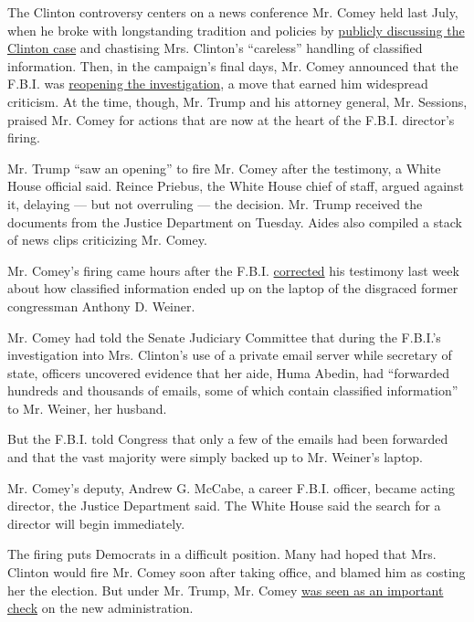 The Clinton controversy centers on a news conference Mr. Comey held last
July, when he broke with longstanding tradition and policies by
\href{https://www.nytimes.com/2016/07/06/us/politics/hillary-clinton-fbi-email-comey.html}{publicly
discussing the Clinton case} and chastising Mrs. Clinton's ``careless''
handling of classified information. Then, in the campaign's final days,
Mr. Comey announced that the F.B.I. was
\href{https://www.nytimes.com/2016/10/29/us/politics/fbi-hillary-clinton-email.html?_r=0}{reopening
the investigation}, a move that earned him widespread criticism. At the
time, though, Mr. Trump and his attorney general, Mr. Sessions, praised
Mr. Comey for actions that are now at the heart of the F.B.I. director's
firing.

Mr. Trump ``saw an opening'' to fire Mr. Comey after the testimony, a
White House official said. Reince Priebus, the White House chief of
staff, argued against it, delaying --- but not overruling --- the
decision. Mr. Trump received the documents from the Justice Department
on Tuesday. Aides also compiled a stack of news clips criticizing Mr.
Comey.

Mr. Comey's firing came hours after the F.B.I.
\href{https://www.nytimes.com/2017/05/09/us/politics/comey-clinton-emails-testimony.html}{corrected}
his testimony last week about how classified information ended up on the
laptop of the disgraced former congressman Anthony D. Weiner.

Mr. Comey had told the Senate Judiciary Committee that during the
F.B.I.'s investigation into Mrs. Clinton's use of a private email server
while secretary of state, officers uncovered evidence that her aide,
Huma Abedin, had ``forwarded hundreds and thousands of emails, some of
which contain classified information'' to Mr. Weiner, her husband.

But the F.B.I. told Congress that only a few of the emails had been
forwarded and that the vast majority were simply backed up to Mr.
Weiner's laptop.

Mr. Comey's deputy, Andrew G. McCabe, a career F.B.I. officer, became
acting director, the Justice Department said. The White House said the
search for a director will begin immediately.

The firing puts Democrats in a difficult position. Many had hoped that
Mrs. Clinton would fire Mr. Comey soon after taking office, and blamed
him as costing her the election. But under Mr. Trump, Mr. Comey
\href{https://www.nytimes.com/2016/11/19/us/politics/james-comey-fbi-sessions.html}{was
seen as an important check} on the new administration.

